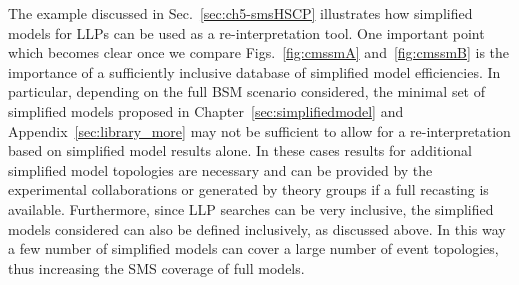 The example discussed in Sec.~\ref{sec:ch5-smsHSCP} illustrates how simplified
models for LLPs can be used as a re-interpretation tool. One important
point which becomes clear once we compare Figs.~\ref{fig:cmssmA} and~\ref{fig:cmssmB} 
is the importance of a sufficiently inclusive database of simplified 
model efficiencies. In particular, depending on the full BSM scenario considered,
the minimal set of simplified models proposed in Chapter~\ref{sec:simplifiedmodel} and 
Appendix~\ref{sec:library_more} may not be sufficient to allow for a re-interpretation 
based on simplified model results alone. In these cases results for additional simplified 
model topologies are necessary and can be provided by the experimental collaborations or 
generated by theory groups if a full recasting is available.
Furthermore, since LLP searches can be very inclusive,
the simplified models considered can also be defined inclusively,
as discussed above. In this way a few number of simplified models
can cover a large number of event topologies, thus increasing the
SMS coverage of full models.



